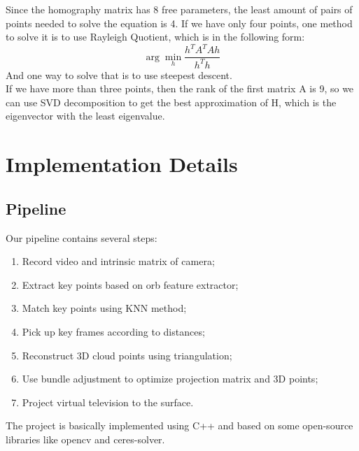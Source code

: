 \documentclass[paper=a4, fontsize=14pt]{scrartcl}
\numberwithin{equation}{section}		%
\numberwithin{figure}{section}			%
\numberwithin{table}{section}				%
\begin{document}
\indent Since the homography matrix has 8 free parameters, the least amount of pairs of points needed to solve the equation is 4. If we have only four points, one method to solve it is to use Rayleigh Quotient\cite{horn1985cr}, which is in the following form:
$$\arg \min_h \frac{h^TA^TAh}{h^Th}$$
\indent And one way to solve that is to use steepest descent.\\
\indent If we have more than three points, then the rank of the first matrix A is 9, so we can use SVD decomposition to get the best approximation of H, which is the eigenvector with the least eigenvalue.

\newpage
\section{Implementation Details}\label{implementation}

\subsection{Pipeline}
Our pipeline contains several steps: 
\begin{enumerate}
    \item Record video and intrinsic matrix of camera; 
    \item Extract key points based on orb feature extractor; 
    \item Match key points using KNN method; 
    \item Pick up key frames according to distances; 
    \item Reconstruct 3D cloud points using triangulation; 
    \item Use bundle adjustment to optimize projection matrix and 3D points; 
    \item Project virtual television to the surface. 
\end{enumerate}
The project is basically implemented using C++ and based on some open-source libraries like opencv\cite{itseez2015opencv} and ceres-solver\cite{ceres-solver}.
\end{document}
